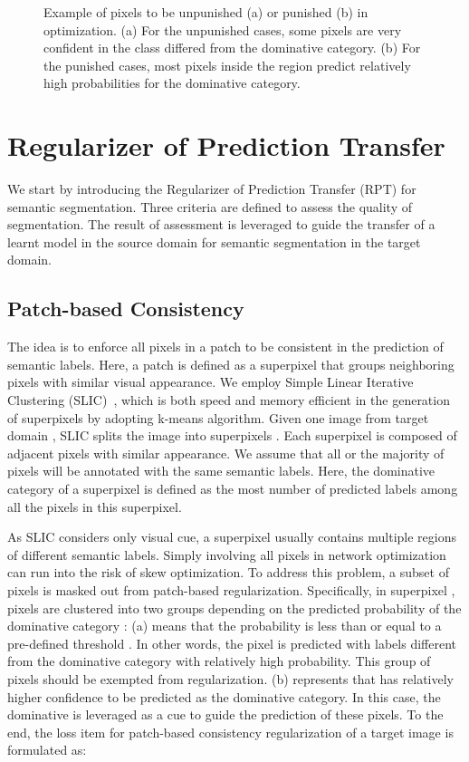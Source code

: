 \documentclass[10pt,twocolumn,letterpaper]{article}
\begin{document}
\begin{figure}[!tb]
   \caption{\small Example of pixels to be unpunished (a) or punished (b) in optimization. (a) For the unpunished cases, some pixels are very confident in the class differed from the dominative category. (b) For the punished cases, most pixels inside the region predict relatively high probabilities for the dominative category.}
   \label{fig:patch}
   \vspace{-0.15in}
\end{figure}
\section{Regularizer of Prediction Transfer}
We start by introducing the Regularizer of Prediction Transfer (RPT) for semantic segmentation.
Three criteria are defined to assess the quality of segmentation. The result of assessment is leveraged to guide the transfer of a learnt model in the source domain for semantic segmentation in the target domain.

\subsection{Patch-based Consistency}
The idea is to enforce all pixels in a patch to be consistent in the prediction of semantic labels. Here, a patch is defined as a superpixel that groups neighboring pixels with similar visual appearance. We employ Simple Linear Iterative Clustering (SLIC)~\cite{achanta2012slic}, which is both speed and memory efficient in the generation of superpixels by adopting k-means algorithm.
Given one image from target domain , SLIC splits the image into  superpixels . Each superpixel  is composed of  adjacent pixels with similar appearance.
We assume that all or the majority of pixels will be annotated with the same semantic labels. Here, the dominative category  of a superpixel is defined as the most number of predicted labels among all the pixels in this superpixel.

As SLIC considers only visual cue, a superpixel usually contains multiple regions of different semantic labels. Simply involving all pixels in network optimization can run into the risk of skew optimization. To address this problem, a subset of pixels is masked out from patch-based regularization.
Specifically, in superpixel , pixels  are clustered into two groups depending on the predicted probability of the dominative category : (a)  means that the probability is less than or equal to a pre-defined threshold . In other words, the pixel  is predicted with labels different from the dominative category with relatively high probability. This group of pixels should be exempted from regularization. (b)  represents that  has relatively higher confidence to be predicted as the dominative category. In this case, the dominative  is leveraged as a cue to guide the prediction of these pixels. To the end, the loss item for patch-based consistency regularization of a target image  is formulated as:
\end{document}

